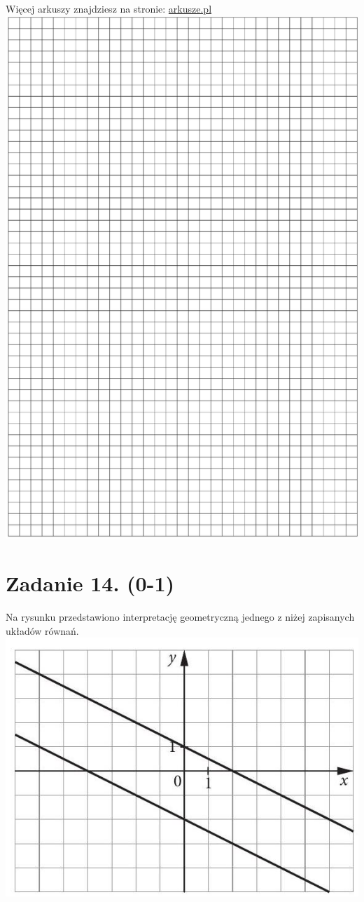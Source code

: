 \documentclass[10pt]{article}
\begin{document}
Więcej arkuszy znajdziesz na stronie: \href{http://arkusze.pl}{arkusze.pl}\\
\includegraphics[max width=\textwidth, center]{2024_11_21_4a1915d79134dda0750eg-05}

\section*{Zadanie 14. (0-1)}
Na rysunku przedstawiono interpretację geometryczną jednego z niżej zapisanych układów równań.\\
\includegraphics[max width=\textwidth, center]{2024_11_21_4a1915d79134dda0750eg-06}
\end{document}
